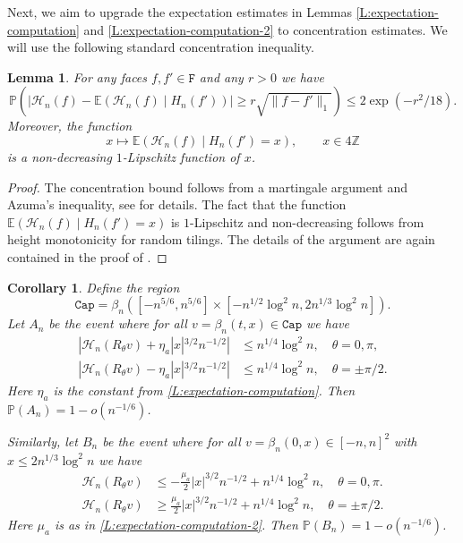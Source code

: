 \documentclass[11pt,twoside]{amsart}
\theoremstyle{plain}
\newtheorem{cor}[thm]{Corollary}
\newtheorem{lem}[thm]{Lemma}
\numberwithin{quest}{section}
\theoremstyle{remark}
\numberwithin{rem}{section}
\theoremstyle{definition}
\newcommand{\Z}{\mathbb{Z}}
\renewcommand{\P}{\mathbb{P}}
\newcommand{\E}{\mathbb{E}}
\newcommand{\cH}{\mathcal{H}}
\renewcommand{\tt}[1]{{\mathtt{#1}}}
\begin{document}
	Next, we aim to upgrade the expectation estimates in Lemmas \ref{L:expectation-computation} and \ref{L:expectation-computation-2} to concentration estimates. We will use the following standard concentration inequality.
	
	\begin{lem}
		\label{L:concentration-lem}
		For any faces $f, f' \in \tt{F}$ and any $r > 0$ we have
		$$
		\P(|\mathcal{H}_n(f) - \E (\cH_n(f) \mid H_n(f'))| \ge r \sqrt{\|f - f'\|_1}) \le 2\exp(- r^2/18).
		$$
		Moreover, the function 
		$$
		x \mapsto \E (\cH_n(f) \mid H_n(f') = x), \qquad x \in 4 \Z
		$$
		is a non-decreasing $1$-Lipschitz function of $x$.
	\end{lem}
	
	\begin{proof}
		The concentration bound follows from a martingale argument and Azuma's inequality, see \cite[Theorem 5.8]{Gor21} for details. The fact that the function $\E (\cH_n(f) \mid H_n(f') = x)$ is $1$-Lipschitz and non-decreasing follows from height monotonicity for random tilings. The details of the argument are again contained in the proof of \cite[Theorem 5.8]{Gor21}.
	\end{proof}
	
	
		
	\begin{cor}
		\label{C:rough-phase-heights}
		Define the region
		$$
		\tt{Cap} = \beta_n([-n^{5/6}, n^{5/6}] \times [-n^{1/2} \log^2 n, 2n^{1/3} \log^2 n]). 
		$$
		Let $A_n$ be the event where for all $v = \beta_n(t, x) \in \tt{Cap}$ we have
		\begin{align*}
			|\mathcal H_n(R_\theta  v) + \eta_a |x|^{3/2} n^{-1/2}| &\le n^{1/4} \log^2 n, \quad \theta = 0, \pi, \\
			|\mathcal H_n(R_\theta  v) - \eta_a |x|^{3/2} n^{-1/2}| &\le n^{1/4} \log^2 n, \quad \theta = \pm \pi/2.
		\end{align*}
		Here $\eta_a$ is the constant from \cref{L:expectation-computation}.
		Then $\P(A_n) = 1 - o(n^{-1/6})$.
		
		Similarly, let $B_n$ be the event where for all $v = \beta_n(0, x) \in [-n, n]^2$ with $x \le 2 n^{1/3} \log^2 n$ we have
		\begin{align*}
			\cH_n(R_\theta v) &\le -\frac{\mu_a}{2} |x|^{3/2} n^{-1/2} + n^{1/4} \log^2 n, \quad \theta = 0, \pi.\\ \cH_n(R_\theta v) &\ge \frac{\mu_a}{2} |x|^{3/2} n^{-1/2} + n^{1/4} \log^2 n, \quad \theta = \pm \pi/2.
		\end{align*}
		Here $\mu_a$ is as in \cref{L:expectation-computation-2}. Then $\P(B_n) = 1 - o(n^{-1/6})$.
	\end{cor}
	
\end{document}
